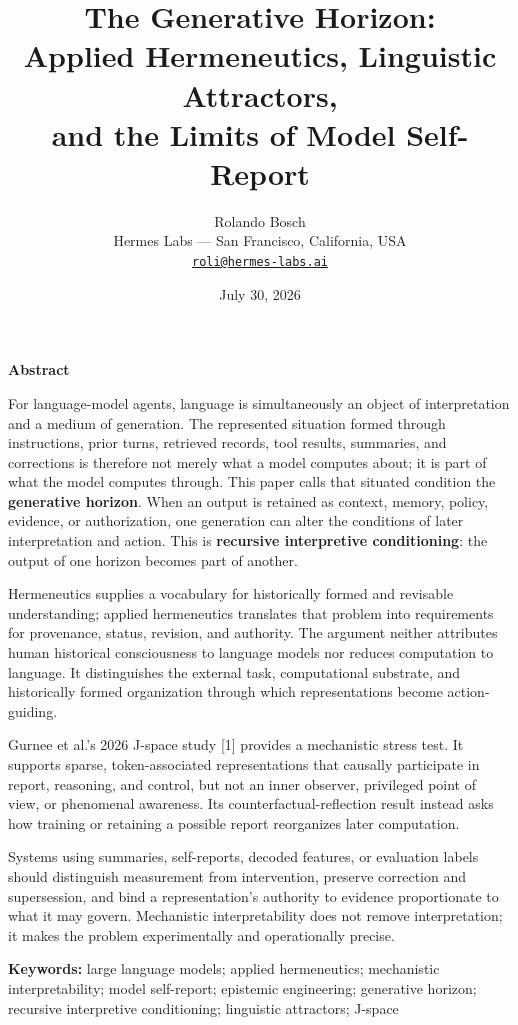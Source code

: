 \documentclass[12pt]{article}
\title{The Generative Horizon:\\
Applied Hermeneutics, Linguistic Attractors,\\
and the Limits of Model Self-Report}
\author{Rolando Bosch\\
Hermes Labs --- San Francisco, California, USA\\
\href{mailto:roli@hermes-labs.ai}{\texttt{roli@hermes-labs.ai}}}
\date{July 30, 2026}
\renewenvironment{abstract}
  {\par\small\begin{center}\bfseries\abstractname\end{center}\vspace{-0.45em}}
  {\par\normalsize}
\begin{document}
\maketitle
\thispagestyle{empty}
\renewcommand{\abstractname}{Abstract}
\begin{abstract}
\setlength{\parskip}{0.25em}
\begin{list}{}{\setlength{\leftmargin}{0.30in}\setlength{\rightmargin}{0.30in}}\item[]
For language-model agents, language is simultaneously an object of interpretation and a medium of generation. The represented situation formed through instructions, prior turns, retrieved records, tool results, summaries, and corrections is therefore not merely what a model computes about; it is part of what the model computes through. This paper calls that situated condition the \textbf{generative horizon}. When an output is retained as context, memory, policy, evidence, or authorization, one generation can alter the conditions of later interpretation and action. This is \textbf{recursive interpretive conditioning}: the output of one horizon becomes part of another.

Hermeneutics supplies a vocabulary for historically formed and revisable understanding; applied hermeneutics translates that problem into requirements for provenance, status, revision, and authority. The argument neither attributes human historical consciousness to language models nor reduces computation to language. It distinguishes the external task, computational substrate, and historically formed organization through which representations become action-guiding.

Gurnee et al.'s 2026 J-space study {[}1{]} provides a mechanistic stress test. It supports sparse, token-associated representations that causally participate in report, reasoning, and control, but not an inner observer, privileged point of view, or phenomenal awareness. Its counterfactual-reflection result instead asks how training or retaining a possible report reorganizes later computation.

Systems using summaries, self-reports, decoded features, or evaluation labels should distinguish measurement from intervention, preserve correction and supersession, and bind a representation's authority to evidence proportionate to what it may govern. Mechanistic interpretability does not remove interpretation; it makes the problem experimentally and operationally precise.

\vspace{0.35em}\noindent\textbf{Keywords:} large language models; applied hermeneutics; mechanistic interpretability; model self-report; epistemic engineering; generative horizon; recursive interpretive conditioning; linguistic attractors; J-space
\end{list}
\end{abstract}
\end{document}
